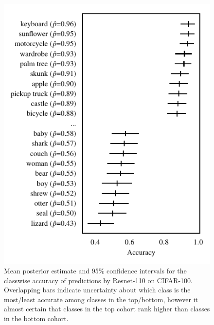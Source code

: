 \documentclass{article}
\begin{document}
\begin{figure}[t]
    \centering
    \includegraphics{figures/cifar100_accuracy.pdf}  
    \caption{
        Mean posterior estimate and 95\% confidence intervals for the classwise accuracy of predictions by Resnet-110 on CIFAR-100.
        Overlapping bars indicate uncertainty about which class is the most/least accurate among classes in the top/bottom, however it almost certain that classes in the top cohort rank higher than classes in the bottom cohort.
    }
    \label{fig:cifar100_acc}
\end{figure}
\end{document}

